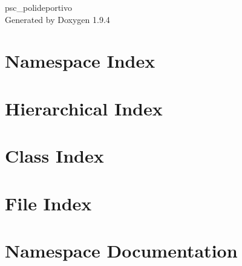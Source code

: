 \documentclass[twoside]{book}
\newcommand{\+}{\discretionary{\mbox{\scriptsize$\hookleftarrow$}}{}{}}
\newcommand{\clearemptydoublepage}{%
    \newpage{\pagestyle{empty}\cleardoublepage}%
  }
\begin{document}
  \raggedbottom
    \hypersetup{pageanchor=false,
                bookmarksnumbered=true,
                pdfencoding=unicode
               }
  \begin{titlepage}
  \vspace*{7cm}
  \begin{center}%
  {\Large psc\+\_\+polideportivo}\\
  \vspace*{1cm}
  {\large Generated by Doxygen 1.9.4}\\
  \end{center}
  \end{titlepage}
  \clearemptydoublepage
  \tableofcontents
  \clearemptydoublepage
  \hypersetup{pageanchor=true}
\chapter{Namespace Index}

\chapter{Hierarchical Index}

\chapter{Class Index}

\chapter{File Index}

\chapter{Namespace Documentation}



\end{document}
